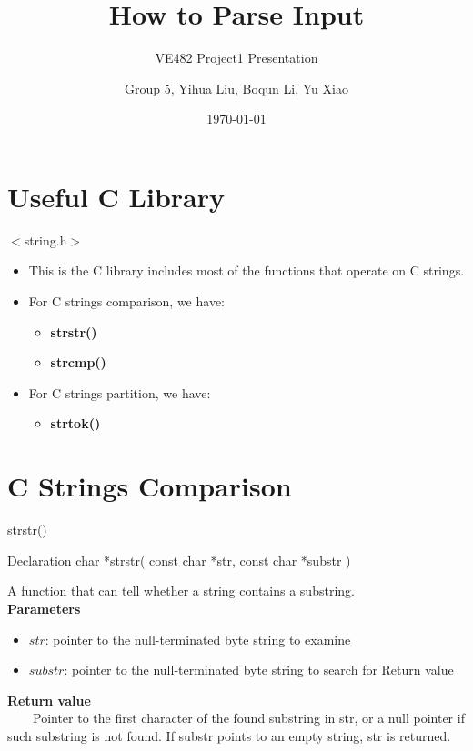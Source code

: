\documentclass[12pt]{beamer}
\begin{document}
\title{How to Parse Input}
\subtitle{VE482 Project1 Presentation}
\author{Group 5, Yihua Liu, Boqun Li, Yu Xiao}
\date{\today}
\begin{frame}
    \titlepage
\end{frame}


\section{Useful C Library}
\begin{frame}{$<$string.h$>$}
    \begin{itemize}
        \item This is the C library includes most of the functions that operate on C strings.
        \item For C strings comparison, we have:
            \begin{itemize}
                \item \textbf{strstr()}
                \item \textbf{strcmp()}
            \end{itemize}
        \item For C strings partition, we have:
            \begin{itemize}
                \item \textbf{strtok()}
            \end{itemize}
    \end{itemize}
\end{frame}

\section{C Strings Comparison}
\begin{frame}{strstr()}
    \begin{block}{Declaration}
        char *strstr( const char *str, const char *substr )
    \end{block}
    A function that can tell whether a string contains a substring.\\
    \textbf{Parameters}
    \begin{itemize}
        \item $str$: pointer to the null-terminated byte string to examine
        \item $substr$: pointer to the null-terminated byte string to search for
Return value
    \end{itemize}
    \textbf{Return value} \\
    \ \ \ \ Pointer to the first character of the found substring in str, or a null pointer if such substring is not found. If substr points to an empty string, str is returned.
\end{frame}
\end{document}
